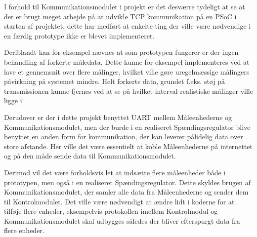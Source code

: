 
I forhold til Kommunikationsmodulet i projekt er det desværre tydeligt at se at der er brugt meget arbejde på at udvikle TCP kommunikation på en PSoC i starten af projektet, dette har medført at enkelte ting der ville være nødvendige i en færdig prototype ikke er blevet implementeret.

Deriblandt kan for eksempel nævnes at som prototypen fungerer er der ingen behandling af forkerte måledata. Dette kunne for eksempel implementeres ved at lave et gennemsnit over flere målinger, hvilket ville gøre uregelmæssige målingers påvirkning på systemet mindre. Helt forkerte data, grundet f.eks. støj på transmissionen kunne fjernes ved at se på hvilket interval realistiske målinger ville ligge i.

Derudover er der i dette projekt benyttet UART mellem Måleenhederne og Kommunikationsmodulet, men der burde i en realiseret Spændingsregulator blive benyttet en anden form for kommunikation, der kan leverer pålidelig data over store afstande. Her ville det være essentielt at koble Måleenhederne på internettet og på den måde sende data til Kommunikationsmodulet.

Derimod vil det være forholdsvis let at indsætte flere måleenheder både i prototypen, men også i en realiseret Spændingsregulator. Dette skyldes brugen af Kommunikationsmodulet, der samler alle data fra Måleenhederne og sender dem til Kontrolmodulet. Det ville være nødvendigt at ændre lidt i koderne for at tilføje flere enheder, eksempelvis protokollen imellem Kontrolmodul og Kommunikationsmodulet skal udbygges således der bliver efterspurgt data fra flere enheder.


